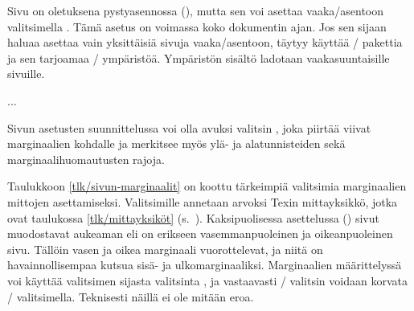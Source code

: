 \begin{koodilohkosis}
\end{koodilohkosis}

\noindent
Sivu on oletuksena pystyasennossa (), mutta sen voi
asettaa vaaka\-/asentoon valitsimella . Tämä asetus on
voimassa koko dokumentin ajan. Jos sen sijaan haluaa asettaa vain
yksittäisiä sivuja vaaka\-/asentoon, täytyy käyttää
\-/ pakettia ja sen tarjoamaa
\-/ ympäristöä. Ympäristön sisältö ladotaan
vaakasuuntaisille sivuille.

\begin{koodilohkosis}
\begin{landscape}
  ...
\end{landscape}
\end{koodilohkosis}

\noindent
Sivun asetusten suunnittelussa voi olla avuksi valitsin
, joka piirtää viivat marginaalien kohdalle ja
merkitsee myös ylä- ja alatunnisteiden sekä marginaalihuomautusten
rajoja.

Taulukkoon \ref{tlk/sivun-marginaalit} on koottu tärkeimpiä valitsimia
marginaalien mittojen asettamiseksi. Valitsimille annetaan arvoksi Texin
mittayksikkö, jotka ovat taulukossa \ref{tlk/mittayksiköt}
(s.~\pageref{tlk/mittayksiköt}). Kaksipuolisessa asettelussa
() sivut muodostavat aukeaman eli on erikseen
vasemmanpuoleinen ja oikeanpuoleinen sivu. Tällöin vasen ja oikea
marginaali vuorottelevat, ja niitä on havainnollisempaa kutsua sisä- ja
ulkomarginaaliksi. Marginaalien määrittelyssä voi käyttää valitsimen
 sijasta valitsinta , ja vastaavasti
\-/ valitsin voidaan korvata \-/ valitsimella.
Teknisesti näillä ei ole mitään eroa.


